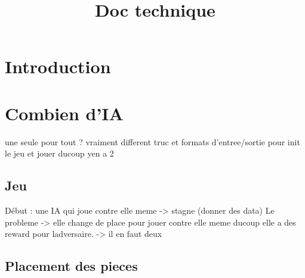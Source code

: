 \documentclass{article}
\title{Doc technique}
\begin{document}
\maketitle

\section{Introduction}


\section{Combien d'IA}
une seule pour tout ?
vraiment different truc et formats d'entree/sortie pour init le jeu et jouer ducoup yen a 2

\subsection{Jeu}
Début : une IA qui joue contre elle meme -> stagne (donner des data)
Le probleme -> elle change de place pour jouer contre elle meme ducoup elle a des reward pour ladversaire.
-> il en faut deux

\subsection{Placement des pieces}
\end{document}
